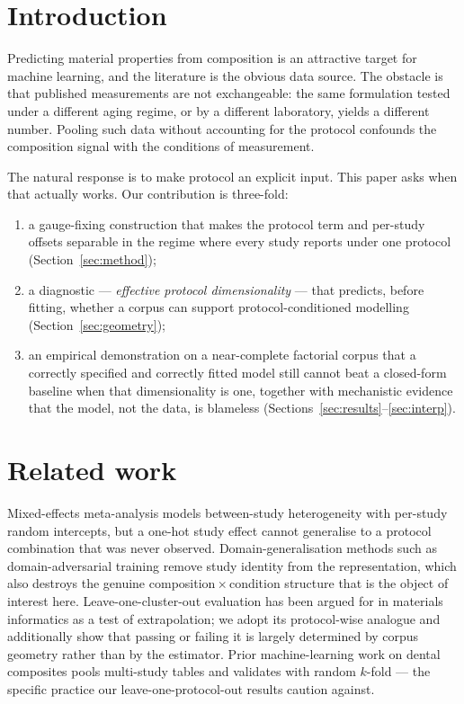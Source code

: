 \documentclass[11pt]{article}
\begin{document}
\section{Introduction}

Predicting material properties from composition is an attractive target for
machine learning, and the literature is the obvious data source. The obstacle
is that published measurements are not exchangeable: the same formulation
tested under a different aging regime, or by a different laboratory, yields a
different number. Pooling such data without accounting for the protocol
confounds the composition signal with the conditions of measurement.

The natural response is to make protocol an explicit input. This paper asks
when that actually works. Our contribution is three-fold:
\begin{enumerate}
  \item a gauge-fixing construction that makes the protocol term and per-study
        offsets separable in the regime where every study reports under one
        protocol (Section~\ref{sec:method});
  \item a diagnostic --- \emph{effective protocol dimensionality} --- that
        predicts, before fitting, whether a corpus can support
        protocol-conditioned modelling (Section~\ref{sec:geometry});
  \item an empirical demonstration on a near-complete factorial corpus that a
        correctly specified and correctly fitted model still cannot beat a
        closed-form baseline when that dimensionality is one, together with
        mechanistic evidence that the model, not the data, is blameless
        (Sections~\ref{sec:results}--\ref{sec:interp}).
\end{enumerate}

\section{Related work}

Mixed-effects meta-analysis models between-study heterogeneity with per-study
random intercepts, but a one-hot study effect cannot generalise to a protocol
combination that was never observed. Domain-generalisation methods such as
domain-adversarial training remove study identity from the representation,
which also destroys the genuine composition\,$\times$\,condition structure that
is the object of interest here. Leave-one-cluster-out evaluation has been
argued for in materials informatics as a test of extrapolation; we adopt its
protocol-wise analogue and additionally show that passing or failing it is
largely determined by corpus geometry rather than by the estimator. Prior
machine-learning work on dental composites \citep{paniagua2025} pools
multi-study tables and validates with random $k$-fold --- the specific practice
our leave-one-protocol-out results caution against.
\end{document}
